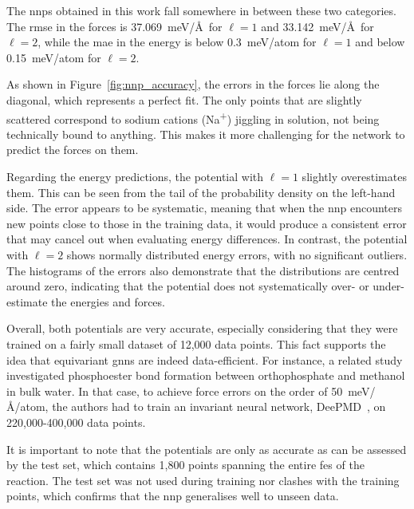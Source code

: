 The \acp{nnp} obtained in this work fall somewhere in between these two categories. The \ac{rmse} in the forces is 37.069~meV/\AA\ for $\ell=1$ and 33.142~meV/\AA\ for $\ell=2$, while the \ac{mae} in the energy is below 0.3~meV/atom for $\ell=1$ and below 0.15~meV/atom for $\ell=2$.

As shown in Figure~\ref{fig:nnp_accuracy}, the errors in the forces lie along the diagonal, which represents a perfect fit. The only points that are slightly scattered correspond to sodium cations (Na\textsuperscript{+}) jiggling in solution, not being technically bound to anything. This makes it more challenging for the network to predict the forces on them.

Regarding the energy predictions, the potential with $\ell=1$ slightly overestimates them. This can be seen from the tail of the probability density on the left-hand side. The error appears to be systematic, meaning that when the \ac{nnp} encounters new points close to those in the training data, it would produce a consistent error that may cancel out when evaluating energy differences. In contrast, the potential with $\ell=2$ shows normally distributed energy errors, with no significant outliers. The histograms of the errors also demonstrate that the distributions are centred around zero, indicating that the potential does not systematically over- or under-estimate the energies and forces.

Overall, both potentials are very accurate, especially considering that they were trained on a fairly small dataset of 12,000 data points. This fact supports the idea that equivariant \acp{gnn} are indeed data-efficient. For instance, a related study~\citep{benayadPrebioticChemicalReactivity2024} investigated phosphoester bond formation between orthophosphate and methanol in bulk water. In that case, to achieve force errors on the order of 50~meV/\AA/atom, the authors had to train an invariant neural network, DeePMD~\citep{zengDeePMDkitV2Software2023}, on 220,000-400,000 data points.

It is important to note that the potentials are only as accurate as can be assessed by the test set, which contains 1,800 points spanning the entire \ac{fes} of the reaction. The test set was not used during training nor clashes with the training points, which confirms that the \ac{nnp} generalises well to unseen data.

